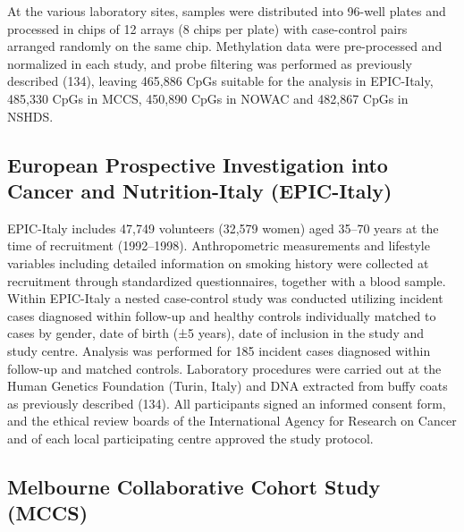 \documentclass[11pt,oneside]{bristolthesis}
\begin{document}
At the various laboratory sites, samples were distributed into 96-well plates and processed in chips of 12 arrays (8 chips per plate) with case-control pairs arranged randomly on the same chip. Methylation data were pre-processed and normalized in each study, and probe filtering was performed as previously described (134), leaving 465,886 CpGs suitable for the analysis in EPIC-Italy, 485,330 CpGs in MCCS, 450,890 CpGs in NOWAC and 482,867 CpGs in NSHDS.

\hypertarget{epic-italy}{%
\subsection{European Prospective Investigation into Cancer and Nutrition-Italy (EPIC-Italy)}\label{epic-italy}}

EPIC-Italy includes 47,749 volunteers (32,579 women) aged 35--70 years at the time of recruitment (1992--1998). Anthropometric measurements and lifestyle variables including detailed information on smoking history were collected at recruitment through standardized questionnaires, together with a blood sample. Within EPIC-Italy a nested case-control study was conducted utilizing incident cases diagnosed within follow-up and healthy controls individually matched to cases by gender, date of birth (±5 years), date of inclusion in the study and study centre. Analysis was performed for 185 incident cases diagnosed within follow-up and matched controls. Laboratory procedures were carried out at the Human Genetics Foundation (Turin, Italy) and DNA extracted from buffy coats as previously described (134). All participants signed an informed consent form, and the ethical review boards of the International Agency for Research on Cancer and of each local participating centre approved the study protocol.

\hypertarget{mccs}{%
\subsection{Melbourne Collaborative Cohort Study (MCCS)}\label{mccs}}
\end{document}
